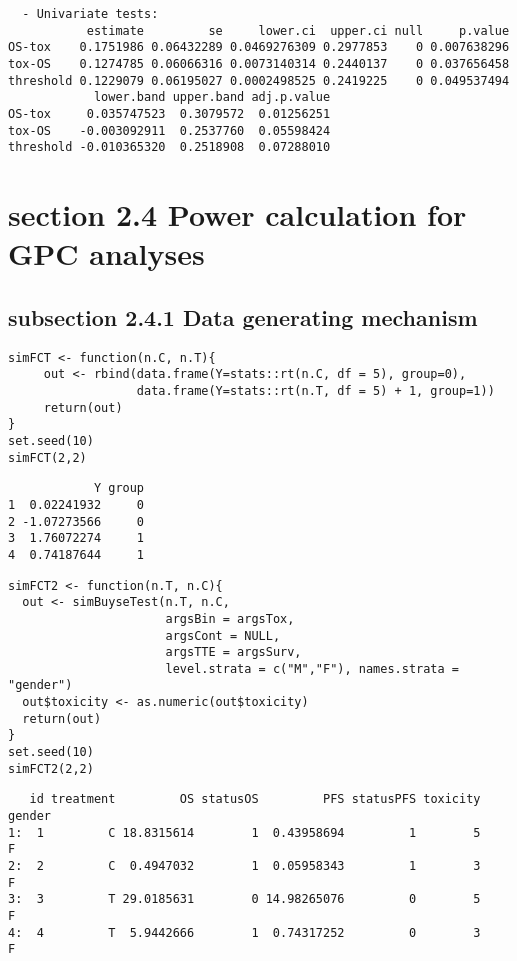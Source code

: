 \documentclass[12pt]{article}
\begin{document}
\begin{verbatim}
  - Univariate tests:
           estimate         se     lower.ci  upper.ci null     p.value
OS-tox    0.1751986 0.06432289 0.0469276309 0.2977853    0 0.007638296
tox-OS    0.1274785 0.06066316 0.0073140314 0.2440137    0 0.037656458
threshold 0.1229079 0.06195027 0.0002498525 0.2419225    0 0.049537494
            lower.band upper.band adj.p.value
OS-tox     0.035747523  0.3079572  0.01256251
tox-OS    -0.003092911  0.2537760  0.05598424
threshold -0.010365320  0.2518908  0.07288010
\end{verbatim}

\section{section 2.4 Power calculation for GPC analyses}
\label{sec:org7aec7d6}
\subsection{subsection 2.4.1 Data generating mechanism}
\label{sec:org2441b44}
\lstset{language=r,label= ,caption= ,captionpos=b,numbers=none}
\begin{lstlisting}
simFCT <- function(n.C, n.T){
     out <- rbind(data.frame(Y=stats::rt(n.C, df = 5), group=0),
                  data.frame(Y=stats::rt(n.T, df = 5) + 1, group=1))
     return(out)
}
set.seed(10)
simFCT(2,2)
\end{lstlisting}

\begin{verbatim}
            Y group
1  0.02241932     0
2 -1.07273566     0
3  1.76072274     1
4  0.74187644     1
\end{verbatim}



\lstset{language=r,label= ,caption= ,captionpos=b,numbers=none}
\begin{lstlisting}
simFCT2 <- function(n.T, n.C){
  out <- simBuyseTest(n.T, n.C,
                      argsBin = argsTox,
                      argsCont = NULL,
                      argsTTE = argsSurv,
                      level.strata = c("M","F"), names.strata = "gender")
  out$toxicity <- as.numeric(out$toxicity)
  return(out)
}
set.seed(10)
simFCT2(2,2) 
\end{lstlisting}

\begin{verbatim}
   id treatment         OS statusOS         PFS statusPFS toxicity gender
1:  1         C 18.8315614        1  0.43958694         1        5      F
2:  2         C  0.4947032        1  0.05958343         1        3      F
3:  3         T 29.0185631        0 14.98265076         0        5      F
4:  4         T  5.9442666        1  0.74317252         0        3      F
\end{verbatim}
\end{document}
